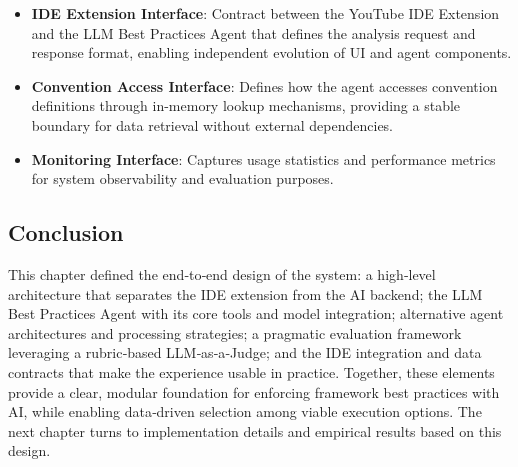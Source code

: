 \begin{spacing}{1.2}
\begin{itemize}
    \item \textbf{IDE Extension Interface}: Contract between the YouTube IDE Extension and the LLM Best Practices Agent that defines the analysis request and response format, enabling independent evolution of UI and agent components.
    \item \textbf{Convention Access Interface}: Defines how the agent accesses convention definitions through in-memory lookup mechanisms, providing a stable boundary for data retrieval without external dependencies.
    \item \textbf{Monitoring Interface}: Captures usage statistics and performance metrics for system observability and evaluation purposes.
\end{itemize}


\subsection*{Conclusion}
This chapter defined the end‑to‑end design of the system: a high‑level architecture that separates the IDE extension from the AI backend; the LLM Best Practices Agent with its core tools and model integration; alternative agent architectures and processing strategies; a pragmatic evaluation framework leveraging a rubric‑based LLM‑as‑a‑Judge; and the IDE integration and data contracts that make the experience usable in practice. Together, these elements provide a clear, modular foundation for enforcing framework best practices with AI, while enabling data‑driven selection among viable execution options. The next chapter turns to implementation details and empirical results based on this design.
\end{spacing}
